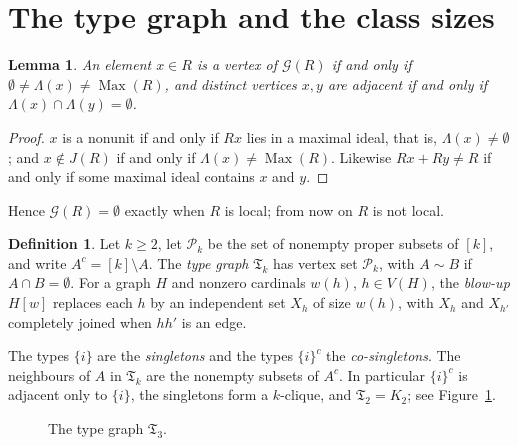 \documentclass[11pt]{amsart}
\newtheorem{lemma}[theorem]{Lemma}
\theoremstyle{definition}
\newtheorem{definition}[theorem]{Definition}
\theoremstyle{remark}
\newcommand{\Max}{\operatorname{Max}}
\newcommand{\Jac}{J}
\newcommand{\G}{\mathcal{G}}
\newcommand{\TG}{\mathfrak{T}}
\newcommand{\Pk}{\mathcal{P}_k}
\newcommand{\co}[1]{{#1}^{c}}
\begin{document}
\section{The type graph and the class sizes}\label{sec:type-graph}

\begin{lemma}\label{lem:adjacency}
An element $x\in R$ is a vertex of $\G(R)$ if and only if $\emptyset\neq\Lambda(x)\neq\Max(R)$, and
distinct vertices $x,y$ are adjacent if and only if $\Lambda(x)\cap\Lambda(y)=\emptyset$.
\end{lemma}

\begin{proof}
$x$ is a nonunit if and only if $Rx$ lies in a maximal ideal, that is, $\Lambda(x)\neq\emptyset$;
and $x\notin\Jac(R)$ if and only if $\Lambda(x)\neq\Max(R)$. Likewise $Rx+Ry\neq R$ if and only if
some maximal ideal contains $x$ and $y$.
\end{proof}

Hence $\G(R)=\emptyset$ exactly when $R$ is local; from now on $R$ is not local.

\begin{definition}\label{def:type-graph}
Let $k\ge2$, let $\Pk$ be the set of nonempty proper subsets of $[k]$, and write
$\co A=[k]\setminus A$. The \emph{type graph} $\TG_k$ has vertex set $\Pk$, with $A\sim B$ if
$A\cap B=\emptyset$. For a graph $H$ and nonzero cardinals $w(h)$, $h\in V(H)$, the \emph{blow-up}
$H[w]$ replaces each $h$ by an independent set $X_h$ of size $w(h)$, with $X_h$ and $X_{h'}$
completely joined when $hh'$ is an edge.
\end{definition}

The types $\{i\}$ are the \emph{singletons} and the types $\co{\{i\}}$ the \emph{co-singletons}. The
neighbours of $A$ in $\TG_k$ are the nonempty subsets of $\co A$. In particular $\co{\{i\}}$ is
adjacent only to $\{i\}$, the singletons form a $k$-clique, and $\TG_2=K_2$; see
Figure~\ref{fig:K3}.

\begin{figure}[ht]
\centering
{}
\caption{The type graph $\TG_3$.}
\label{fig:K3}
\end{figure}
\end{document}
